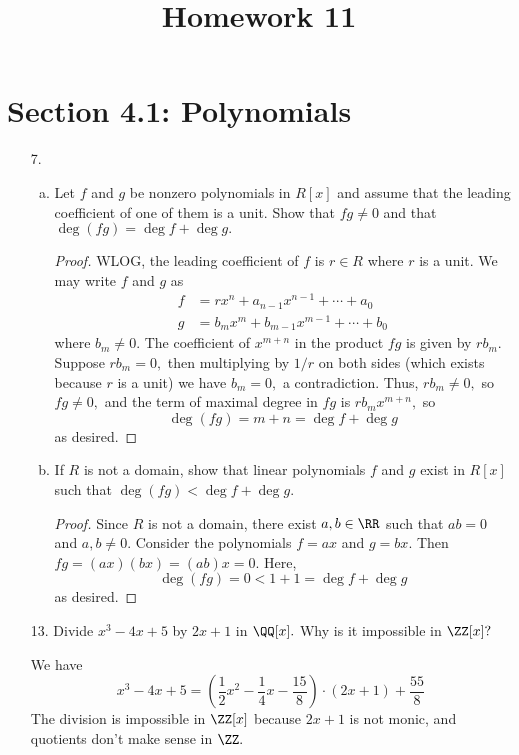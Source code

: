 \documentclass{article}
\begin{document}
\title{Homework 11}
\maketitle
\thispagestyle{fancy}

\section*{Section 4.1: Polynomials}

\begin{itemize}
	\item[7.]
		\begin{enumerate}[a.]
			\item Let $f$ and $g$ be nonzero polynomials in $R[x]$ and assume that the leading coefficient of one of them is a unit. Show that $fg\neq 0$ and that $\deg(fg)=\deg f+\deg g.$
				\begin{proof}
					WLOG, the leading coefficient of $f$ is $r\in R$ where $r$ is a unit. We may write $f$ and $g$ as
					\begin{align*}
						f &= rx^n + a_{n-1}x^{n-1} + \cdots + a_0 \\
						g &= b_m x^m + b_{m-1}x^{m-1} + \cdots + b_0
					\end{align*}
					where $b_m\neq 0.$ The coefficient of $x^{m+n}$ in the product $fg$ is given by $rb_m.$ Suppose $rb_m=0,$ then multiplying by $1/r$ on both sides (which exists because $r$ is a unit) we have $b_m=0,$ a contradiction. Thus, $rb_m\neq 0,$ so $fg\neq 0,$ and the term of maximal degree in $fg$ is $rb_m x^{m+n},$ so \[\deg(fg) = m+n = \deg f + \deg g\] as desired.
				\end{proof}

			\item If $R$ is not a domain, show that linear polynomials $f$ and $g$ exist in $R[x]$ such that $\deg(fg)<\deg f + \deg g.$
				\begin{proof}
					Since $R$ is not a domain, there exist $a, b\in \RR$ such that $ab=0$ and $a, b\neq 0.$ Consider the polynomials $f=ax$ and $g=bx.$ Then $fg=(ax)(bx)=(ab)x=0.$ Here, \[\deg(fg)=0<1+1=\deg f + \deg g\] as desired.
				\end{proof}
				
		\end{enumerate}

	\item[13.] Divide $x^3-4x+5$ by $2x+1$ in $\QQ[x].$ Why is it impossible in $\ZZ[x]?$
		\begin{soln}
			We have \[x^3-4x+5=\left( \frac{1}{2}x^2-\frac{1}{4}x-\frac{15}{8} \right)\cdot(2x+1) + \frac{55}{8}\] The division is impossible in $\ZZ[x]$ because $2x+1$ is not monic, and quotients don't make sense in $\ZZ.$
		\end{soln}



\end{itemize}
\end{document}
